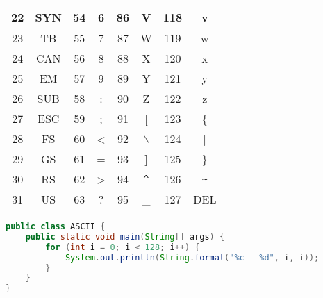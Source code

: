 \begin{longtable}{|c|c|c|c|c|c|c|c|}
	\hline
	22             & SYN           & 54             & 6             & 86             & V                      & 118            & v                      \\
	\hline
	23             & TB            & 55             & 7             & 87             & W                      & 119            & w                      \\
	\hline
	24             & CAN           & 56             & 8             & 88             & X                      & 120            & x                      \\
	\hline
	25             & EM            & 57             & 9             & 89             & Y                      & 121            & y                      \\
	\hline
	26             & SUB           & 58             & :             & 90             & Z                      & 122            & z                      \\
	\hline
	27             & ESC           & 59             & ;             & 91             & [                      & 123            & \{                     \\
			\hline
	28             & FS            & 60             & <             & 92             & $ \backslash $         & 124            & |                      \\
			\hline
	29             & GS            & 61             & =             & 93             & ]                      & 125            & \}                     \\
	\hline
	30             & RS            & 62             & >             & 94             & \lstinline|^| & 126            & \lstinline|~| \\
	\hline
	31             & US            & 63             & ?             & 95             & \_                     & 127            & DEL                    \\
	\hline
\end{longtable}

\vspace{0.5cm}


\begin{lstlisting}[language=Java]
public class ASCII {
	public static void main(String[] args) {
		for (int i = 0; i < 128; i++) {
			System.out.println(String.format("%c - %d", i, i));
		}
	}
}
\end{lstlisting}

\vspace{0.5cm}

